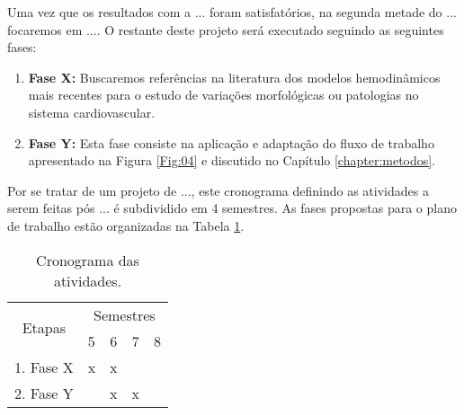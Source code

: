 
Uma vez que os resultados com a ... foram satisfatórios, na segunda metade do ... focaremos em .... O restante deste projeto será executado seguindo as seguintes fases:
\begin{enumerate}
    \item \textbf{Fase X:} Buscaremos referências na literatura dos modelos hemodinâmicos mais recentes para o estudo de variações morfológicas ou patologias no sistema cardiovascular.
    
    \item \textbf{Fase Y:} Esta fase consiste na aplicação e adaptação do fluxo de trabalho apresentado na Figura \ref{Fig:04} e discutido no Capítulo \ref{chapter:metodos}.
    
\end{enumerate}

Por se tratar de um projeto de ..., este cronograma definindo as atividades a serem feitas pós ... é subdividido em 4 semestres. As fases propostas para o plano de trabalho estão organizadas na Tabela \ref{tab:01}.

\begin{table}[h]
\centering
\caption{Cronograma das atividades.}
\begin{tabular}{|c|c|c|c|c|}
\hline
\multirow{2}{*}{{Etapas}} & \multicolumn{4}{c|}{{Semestres}}
\\ \cline{2-5}
    & 5 & 6 & 7 & 8 
\\ \hline
    {1. Fase X} & x & x & & 
\\ \hline
    {2. Fase Y} & & x & x & 
\\ \hline
\end{tabular}
\label{tab:01}
\end{table}
